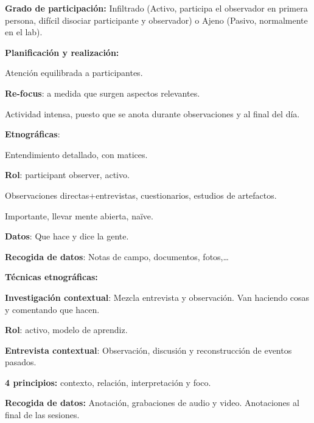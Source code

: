 \documentclass[12pt]{report} %
\begin{document}
\textbf{Grado de participación:} Infiltrado (Activo, participa el
observador en primera persona, difícil disociar participante y
observador) o Ajeno (Pasivo, normalmente en el lab).

\textbf{Planificación y realización:}

\hspace{0pt} Atención equilibrada a participantes.

\hspace{0pt} \textbf{Re-focus}: a medida que surgen aspectos
relevantes.

\hspace{0pt} Actividad intensa, puesto que se anota durante
observaciones y al final del día.

\textbf{Etnográficas}:

\hspace{6mm} Entendimiento detallado, con matices.

\hspace{6mm} \textbf{Rol}: participant observer, activo.

\hspace{6mm} Observaciones directas+entrevistas, cuestionarios, estudios
de artefactos.

\hspace{6mm} Importante, llevar mente abierta, naïve.

\hspace{6mm} \textbf{Datos}: Que hace y dice la gente.

\hspace{6mm} \textbf{Recogida de datos}: Notas de campo, documentos,
fotos,\ldots{}

\textbf{Técnicas etnográficas:}

\hspace{6mm} \textbf{Investigación contextual}: Mezcla entrevista y observación. Van haciendo cosas y comentando que hacen.

\hspace{6mm} \textbf{Rol}: activo, modelo de aprendiz.

\hspace{6mm} \textbf{Entrevista contextual}: Observación, discusión y
reconstrucción de eventos pasados.

\hspace{6mm} \textbf{4 principios:} contexto, relación, interpretación y
foco.

\hspace{6mm} \textbf{Recogida de datos:} Anotación, grabaciones de audio y
video. Anotaciones al final de las sesiones.
\end{document}
